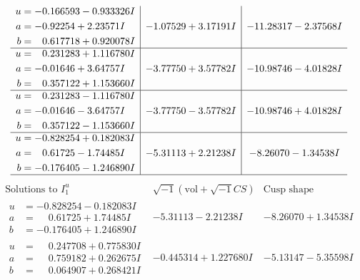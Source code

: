 \documentclass[1p]{elsarticle_modified}
\theoremstyle{definition}
\newcommand{\I}{\sqrt{-1}}
\begin{document}
$$\begin{array}{c|c|c}
\begin{aligned}
u &= -0.166593 - 0.933326 I \\
a &= -0.92254 + 2.23571 I \\
b &= \phantom{-}0.617718 + 0.920078 I\end{aligned}
 & -1.07529 + 3.17191 I & -11.28317 - 2.37568 I \\ \hline\begin{aligned}
u &= \phantom{-}0.231283 + 1.116780 I \\
a &= -0.01646 + 3.64757 I \\
b &= \phantom{-}0.357122 + 1.153660 I\end{aligned}
 & -3.77750 + 3.57782 I & -10.98746 - 4.01828 I \\ \hline\begin{aligned}
u &= \phantom{-}0.231283 - 1.116780 I \\
a &= -0.01646 - 3.64757 I \\
b &= \phantom{-}0.357122 - 1.153660 I\end{aligned}
 & -3.77750 - 3.57782 I & -10.98746 + 4.01828 I \\ \hline\begin{aligned}
u &= -0.828254 + 0.182083 I \\
a &= \phantom{-}0.61725 - 1.74485 I \\
b &= -0.176405 - 1.246890 I\end{aligned}
 & -5.31113 + 2.21238 I & -8.26070 - 1.34538 I\\
 \hline 
 \end{array}$$\newpage$$\begin{array}{c|c|c}  
\text{Solutions to }I^u_{1}& \I (\text{vol} + \sqrt{-1}CS) & \text{Cusp shape}\\
 \hline 
\begin{aligned}
u &= -0.828254 - 0.182083 I \\
a &= \phantom{-}0.61725 + 1.74485 I \\
b &= -0.176405 + 1.246890 I\end{aligned}
 & -5.31113 - 2.21238 I & -8.26070 + 1.34538 I \\ \hline\begin{aligned}
u &= \phantom{-}0.247708 + 0.775830 I \\
a &= \phantom{-}0.759182 + 0.262675 I \\
b &= \phantom{-}0.064907 + 0.268421 I\end{aligned}
 & -0.445314 + 1.227680 I & -5.13147 - 5.35598 I \\ \hline\begin{aligned}

\end{aligned}
\end{array}$$
\end{document}

